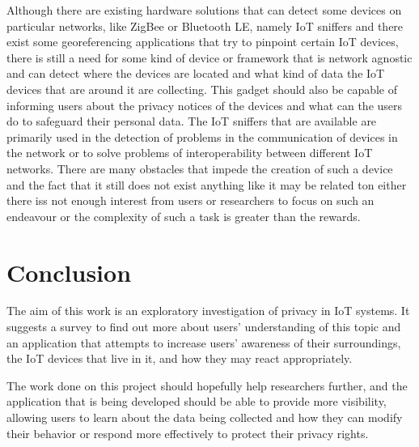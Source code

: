 \documentclass[manuscript,screen,review,natbib=false]{acmart}
\begin{document}
Although there are existing hardware solutions that can detect some devices
on particular networks, like ZigBee or Bluetooth LE, namely IoT sniffers
and there exist some georeferencing applications that try to pinpoint certain
IoT devices, there is still a need for some kind of device or framework
that is network agnostic and can detect where the devices are located and
what kind of data the IoT devices that are around it are collecting. This
gadget should also be capable of informing users about the privacy notices
of the devices and what can the users do to safeguard their personal data.
The IoT sniffers that are available are primarily used in the detection
of problems in the communication of devices in the network or to solve problems
of interoperability between different IoT networks. There are many obstacles
that impede the creation of such a device and the fact that it still does
not exist anything like it may be related ton either there iss not enough
interest from users or researchers to focus on such an endeavour or the
complexity of such a task is greater than the rewards.

\section{Conclusion}

The aim of this work is an exploratory investigation of privacy in IoT systems.
It suggests a survey to find out more about users' understanding of
this topic and an application that attempts to increase users' awareness of
their surroundings, the IoT devices that live in it, and how they may react
appropriately.

The work done on this project should hopefully help researchers further, and the
application that is being developed should be able to provide more visibility,
allowing users to learn about the data being collected and how they can
modify their behavior or respond more effectively to protect their privacy rights.


\printbibliography

\end{document}
